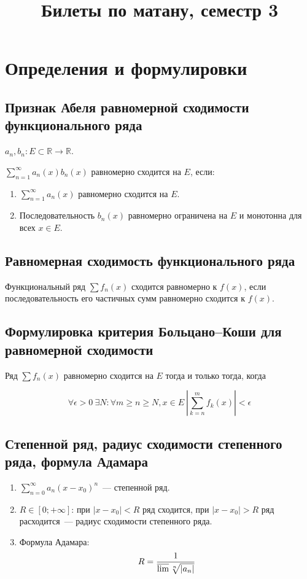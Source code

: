 \documentclass[paper=a4, fontsize=11pt]{article}
\title{Билеты по матану, семестр 3}
\begin{document}
\maketitle
\tableofcontents
\newpage

\section{Определения и формулировки}
\subsection{Признак Абеля равномерной сходимости функционального ряда}
$a_n, b_n: E \subset \mathds{R} \rightarrow \mathds{R}$.

$\sum_{n=1}^{\infty}a_n(x)b_n(x)$ равномерно сходится на $E$, если:

\begin{enumerate}
    \item $\sum_{n=1}^{\infty}a_n(x)$ равномерно сходится на $E$.
    \item Последовательность $b_n(x)$ равномерно ограничена на $E$ и монотонна для всех $x \in E$.
\end{enumerate}

\subsection{Равномерная сходимость функционального ряда}
Функциональный ряд $\sum f_n(x)$ сходится равномерно к $f(x)$, если последовательность его частичных сумм
равномерно сходится к $f(x)$.

\subsection{Формулировка критерия Больцано--Коши для равномерной сходимости}
Ряд $\sum f_n(x)$ равномерно сходится на $E$ тогда и только тогда, когда

$$\forall \epsilon > 0\ \exists N: \forall m \geq n \geq N, x \in E\ |\sum_{k=n}^{m}f_k(x)| < \epsilon$$

\subsection{Степенной ряд, радиус сходимости степенного ряда, формула Адамара}
\begin{enumerate}
    \item $\sum_{n=0}^{\infty} a_n (x-x_0)^n$~--- степенной ряд.
    \item $R \in [0;+\infty]$: при $|x-x_0|<R$ ряд сходится, при $|x-x_0|>R$ ряд расходится~--- радиус сходимости степенного ряда.
    \item Формула Адамара:
        $$R = \frac{1}{\varlimsup \sqrt[n]{|a_n|}}$$
\end{enumerate}
\end{document}
